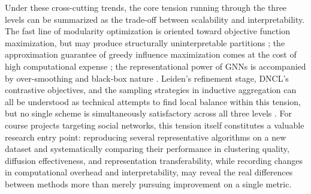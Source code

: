 \documentclass[12pt,a4paper]{article}
\begin{document}
Under these cross-cutting trends, the core tension running through the three levels can be summarized as the trade-off between scalability and interpretability. The fast line of modularity optimization is oriented toward objective function maximization, but may produce structurally uninterpretable partitions \cite{ref1,ref2}; the approximation guarantee of greedy influence maximization comes at the cost of high computational expense \cite{ref6,ref7}; the representational power of GNNs is accompanied by over-smoothing and black-box nature \cite{ref11}. Leiden's refinement stage, DNCL's contrastive objectives, and the sampling strategies in inductive aggregation can all be understood as technical attempts to find local balance within this tension, but no single scheme is simultaneously satisfactory across all three levels \cite{ref2,ref12,ref11}. For course projects targeting social networks, this tension itself constitutes a valuable research entry point: reproducing several representative algorithms on a new dataset and systematically comparing their performance in clustering quality, diffusion effectiveness, and representation transferability, while recording changes in computational overhead and interpretability, may reveal the real differences between methods more than merely pursuing improvement on a single metric.
\end{document}
